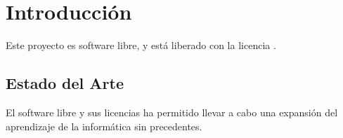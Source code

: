 \chapter{Introducción}

Este proyecto es software libre, y está liberado con la licencia \cite{gplv3}.

\section{Estado del Arte}

El software libre y sus licencias \cite{gplv3} ha permitido llevar a cabo una expansión del
aprendizaje de la informática sin precedentes.